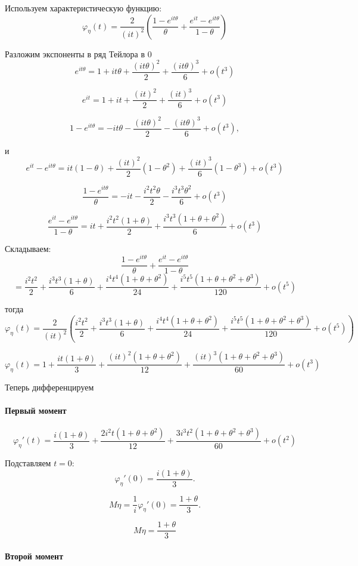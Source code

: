 \documentclass[12pt,a4paper]{article}
\theoremstyle{definition}
\begin{document}
Используем характеристическую функцию:
\[\varphi_\eta(t)
=
\frac2{(it)^2}\left(\frac{1-e^{it\theta}}{\theta}
+
\frac{e^{it}-e^{it\theta}}{1-\theta}\right)\]

Разложим экспоненты в ряд Тейлора в 0 
\[e^{it\theta}=
1+it\theta+\frac{(it\theta)^2}{2}+\frac{(it\theta)^3}{6}+o(t^3)\]

\[e^{it}
=
1+it+\frac{(it)^2}{2}+\frac{(it)^3}{6}+o(t^3)\]

\[1-e^{it\theta}
=
-it\theta-\frac{(it\theta)^2}{2}-\frac{(it\theta)^3}{6}
+o(t^3),\]

и
\[e^{it}-e^{it\theta}=
it(1-\theta)+\frac{(it)^2}{2}(1-\theta^2)+\frac{(it)^3}{6}(1-\theta^3)+o(t^3)\]

\[
\frac{1-e^{it\theta}}{\theta}=
-it-\frac{i^2t^2\theta}{2}-\frac{i^3t^3\theta^2}{6}+o(t^3)\]

\[\frac{e^{it}-e^{it\theta}}{1-\theta}=it
+\frac{i^2t^2(1+\theta)}{2}
+\frac{i^3t^3(1+\theta+\theta^2)}{6}+o(t^3)\]

Складываем:
\[\frac{1-e^{it\theta}}{\theta}
+
\frac{e^{it}-e^{it\theta}}{1-\theta}\]
\[=\frac{i^2t^2}{2}
+
\frac{i^3t^3(1+\theta)}{6}
+
\frac{i^4t^4(1+\theta+\theta^2)}{24}
+
\frac{i^5t^5(1+\theta+\theta^2+\theta^3)}{120}+o(t^5)\]

тогда
\[\varphi_\eta(t)
=
\frac2{(it)^2}\left(\frac{i^2t^2}{2}
+
\frac{i^3t^3(1+\theta)}{6}
+
\frac{i^4t^4(1+\theta+\theta^2)}{24}
+
\frac{i^5t^5(1+\theta+\theta^2+\theta^3)}{120}+o(t^5)\right)\]

\[\varphi_\eta(t)
=1+\frac{it(1+\theta)}{3}+
\frac{(it)^2(1+\theta+\theta^2)}{12}+
\frac{(it)^3(1+\theta+\theta^2+\theta^3)}{60}+o(t^3)\]

Теперь дифференцируем

\paragraph{Первый момент}

\[\varphi_\eta'(t)=\frac{i(1+\theta)}{3}
+
\frac{2i^2t(1+\theta+\theta^2)}{12}
+
\frac{3i^3t^2(1+\theta+\theta^2+\theta^3)}{60}+o(t^2)\]

Подставляем $t=0$:
\[\varphi_\eta'(0)
=\frac{i(1+\theta)}{3}.\]

\[M\eta
=\frac1{i}\varphi_\eta'(0)=\frac{1+\theta}{3}.\]

\[\boxed{M\eta=\frac{1+\theta}{3}}\]

\paragraph{Второй момент}
\end{document}
